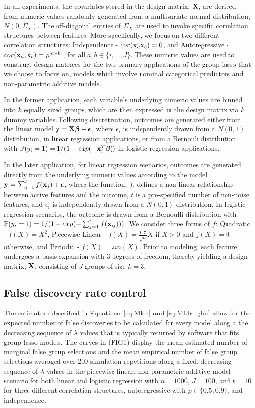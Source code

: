 In all experiments, the covariates stored in the design matrix, $\mathbf{X}$, are derived from numeric values randomly generated from a multivariate normal distribution, $N(0, \Sigma_X)$. The off-diagonal entries of $\Sigma_X$ are used to invoke specific correlation structures between features.  More specifically, we focus on two different correlation structures: Independence - $cor(\mathbf{x}_a \mathbf{x}_b) = 0$, and Autoregressive -  $cor(\mathbf{x}_a, \mathbf{x}_b) = \rho^{|a - b|}$, for all $a, b \in \{i,\ldots,J\}$.  These numeric values are used to construct design matrices for the two primary applications of the group lasso that we choose to focus on, models which involve nominal categorical predictors and non-parametric additive models.  

In the former application, each variable's underlying numeric values are binned into $k$ equally sized groups, which are then expressed in the design matrix via $k$ dummy variables.  Following discretization, outcomes are generated either from the linear model $\mathbf{y} = \mathbf{X} \boldsymbol{\beta}+ \boldsymbol{\epsilon}$, where $\epsilon_i$ is independently drawn from a $N(0,1)$ distribution, in linear regression applications, or from a Bernouli distribution with $\mathbb{P}(y_i = 1) = 1/(1 + exp(-\mathbf{x}_i^T\boldsymbol{\beta}))$ in logistic regression applications.

In the later application, for linear regression scenarios, outcomes are generated directly from the underlying numeric values according to the model $\mathbf{y} = \sum_{j = 1}^{t} f(\mathbf{x}_j) + \boldsymbol{\epsilon}$, where the function, $f$, defines a non-linear relationship between active features and the outcome, $t$ is a pre-specified number of non-noise features, and $\epsilon_i$ is independently drawn from a $N(0,1)$ distribution.  In logistic regression scenarios, the outcome is drawn from a Bernoulli distribution with $\mathbb{P}(y_i = 1) = 1/(1 + exp(- \sum_{j = 1}^{t} f(\mathbf{x}_{ij})))$.  We consider three forms of $f$: Quadratic - $f(X) = X^2$, Piecewise Linear - $f(X) = \tfrac{0.7}{\sqrt{n}}X$ if $X > 0$ and $f(X) = 0$ otherwise, and Periodic - $f(X) = sin(X)$.  Prior to modeling, each feature undergoes a basis expansion with 3 degrees of freedom, thereby yielding a design matrix, $\mathbf{X}$, consisting of $J$ groups of size $k = 3$.

\subsection{False discovery rate control}

The estimators described in Equations~\ref{eq:Mfdr} and \ref{eq:Mfdr_glm} allow for the expected number of false discoveries to be calculated for every model along a the decreasing sequence of $\lambda$ values that is typically returned by software that fits group lasso models.  The curves in (FIG1) display the mean estimated number of marginal false group selections and the mean empirical number of false group selections averaged over 200 simulation repetitions along a fixed, decreasing sequence of $\lambda$ values in the piecewise linear, non-parametric additive model scenario for both linear and logistic regression with $n = 1000$, $J = 100$, and $t = 10$ for three different correlation structures, autoregressive with $\rho \in \{0.5, 0.9\}$, and independence.

